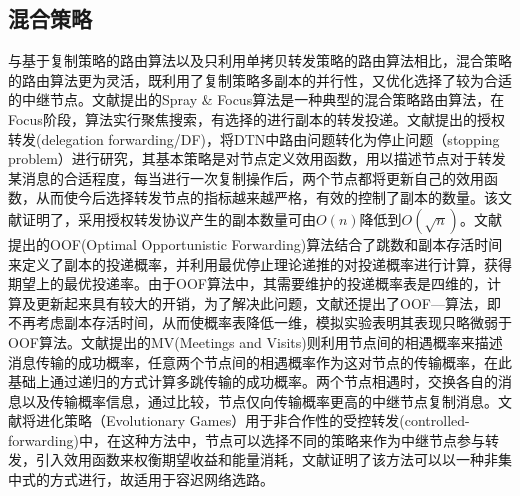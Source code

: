 \subsection{混合策略}

与基于复制策略的路由算法以及只利用单拷贝转发策略的路由算法相比，混合策略的路由算法更为灵活，既利用了复制策略多副本的并行性，又优化选择了较为合适的中继节点。文献\cite{Spyropoulos2007a}提出的Spray \& Focus算法是一种典型的混合策略路由算法，在Focus阶段，算法实行聚焦搜索，有选择的进行副本的转发投递。文献\cite{Erramilli2008}提出的授权转发(delegation forwarding/DF)，将DTN中路由问题转化为停止问题（stopping problem）进行研究，其基本策略是对节点定义效用函数，用以描述节点对于转发某消息的合适程度，每当进行一次复制操作后，两个节点都将更新自己的效用函数，从而使今后选择转发节点的指标越来越严格，有效的控制了副本的数量。该文献证明了，采用授权转发协议产生的副本数量可由$O(n)$降低到$O(\sqrt{n})$。文献\cite{Liu:2009uy}提出的OOF(Optimal Opportunistic Forwarding)算法结合了跳数和副本存活时间来定义了副本的投递概率，并利用最优停止理论递推的对投递概率进行计算，获得期望上的最优投递率。由于OOF算法中，其需要维护的投递概率表是四维的，计算及更新起来具有较大的开销，为了解决此问题，文献\cite{Liu:2009uy}还提出了OOF—算法，即不再考虑副本存活时间，从而使概率表降低一维，模拟实验表明其表现只略微弱于OOF算法。文献\cite{Burns:2005gi}提出的MV(Meetings and Visits)则利用节点间的相遇概率来描述消息传输的成功概率，任意两个节点间的相遇概率作为这对节点的传输概率，在此基础上通过递归的方式计算多跳传输的成功概率。两个节点相遇时，交换各自的消息以及传输概率信息，通过比较，节点仅向传输概率更高的中继节点复制消息。文献\cite{El-Azouzi2013}将进化策略（Evolutionary Games）用于非合作性的受控转发(controlled-forwarding)中，在这种方法中，节点可以选择不同的策略来作为中继节点参与转发，引入效用函数来权衡期望收益和能量消耗，文献\cite{El-Azouzi2013}证明了该方法可以以一种非集中式的方式进行，故适用于容迟网络选路。


